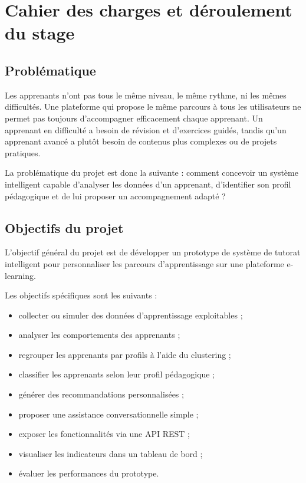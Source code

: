 \documentclass[12pt,a4paper]{report}
\begin{document}
\chapter{Cahier des charges et déroulement du stage}

\section{Problématique}

Les apprenants n'ont pas tous le même niveau, le même rythme, ni les mêmes difficultés. Une plateforme qui propose le même parcours à tous les utilisateurs ne permet pas toujours d'accompagner efficacement chaque apprenant. Un apprenant en difficulté a besoin de révision et d'exercices guidés, tandis qu'un apprenant avancé a plutôt besoin de contenus plus complexes ou de projets pratiques.

La problématique du projet est donc la suivante : comment concevoir un système intelligent capable d'analyser les données d'un apprenant, d'identifier son profil pédagogique et de lui proposer un accompagnement adapté ?

\section{Objectifs du projet}

L'objectif général du projet est de développer un prototype de système de tutorat intelligent pour personnaliser les parcours d'apprentissage sur une plateforme e-learning.

Les objectifs spécifiques sont les suivants :

\begin{itemize}
    \item collecter ou simuler des données d'apprentissage exploitables ;
    \item analyser les comportements des apprenants ;
    \item regrouper les apprenants par profils à l'aide du clustering ;
    \item classifier les apprenants selon leur profil pédagogique ;
    \item générer des recommandations personnalisées ;
    \item proposer une assistance conversationnelle simple ;
    \item exposer les fonctionnalités via une API REST ;
    \item visualiser les indicateurs dans un tableau de bord ;
    \item évaluer les performances du prototype.
\end{itemize}
\end{document}
